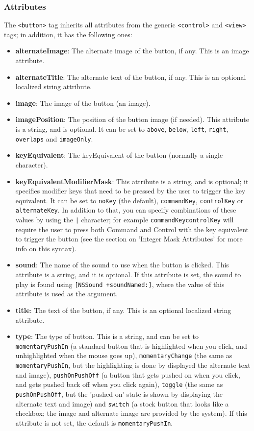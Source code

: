 \subsubsection{Attributes}
The \texttt{<button>} tag inherits all attributes from the generic
\texttt{<control>} and \texttt{<view>} tags; in addition, it has 
the following ones:
\begin{itemize}
\item {\bf alternateImage}: The alternate image of the button, if any.
  This is an image attribute.
\item {\bf alternateTitle}: The alternate text of the button, if any.
  This is an optional localized string attribute.
\item {\bf image}: The image of the button (an image).
\item {\bf imagePosition}: The position of the button image (if
  needed).  This attribute is a string, and is optional.  It can be
  set to \texttt{above}, \texttt{below}, \texttt{left},
  \texttt{right}, \texttt{overlaps} and \texttt{imageOnly}.
\item {\bf keyEquivalent}: The keyEquivalent of the button (normally a
  single character).
\item {\bf keyEquivalentModifierMask}: This attribute is a string, and
  is optional; it specifies modifier keys that need to be pressed by
  the user to trigger the key equivalent.  It can be set to
  \texttt{noKey} (the default), \texttt{commandKey},
  \texttt{controlKey} or \texttt{alternateKey}.  In addition to that,
  you can specify combinations of these values by using the \texttt{|}
  character; for example
  \texttt{commandKey\discretionary{|}{}{|}controlKey} will require the
  user to press both Command and Control with the key equivalent to
  trigger the button (see the section on 'Integer Mask Attributes' for
  more info on this syntax).
\item {\bf sound}: The name of the sound to use when the button is
  clicked.  This attribute is a string, and it is optional.  If this
  attribute is set, the sound to play is found using \texttt{[NSSound
  +soundNamed:]}, where the value of this attribute is used as the
  argument.
\item {\bf title}: The text of the button, if any.  This is an
  optional localized string attribute.
\item {\bf type}: The type of button.  This is a string, and can be
  set to \texttt{momentaryPushIn} (a standard button that is
  highlighted when you click, and unhighlighted when the mouse goes
  up), \texttt{momentaryChange} (the same as \texttt{momentaryPushIn},
  but the highlighting is done by displayed the alternate text and
  image), \texttt{pushOnPushOff} (a button that gets pushed on when
  you click, and gets pushed back off when you click again),
  \texttt{toggle} (the same as \texttt{pushOnPushOff}, but the 'pushed
  on' state is shown by displaying the alternate text and image) and
  \texttt{switch} (a stock button that looks like a checkbox; the
  image and alternate image are provided by the system).  If this
  attribute is not set, the default is \texttt{momentaryPushIn}.
\end{itemize}

